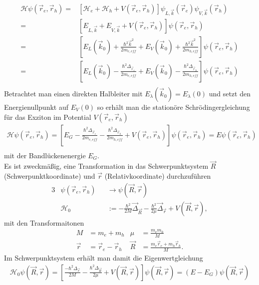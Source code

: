 \begin{align}
\mathcal{H} \psi\left({\vec{r}_e,\vec{r}_h}\right)=&
\left[\mathcal{H}_e+\mathcal{H}_h+V(\vec{r}_e,\vec{r}_h)\right]\psi_{L,\vec{k}}(\vec{r}_e)\psi_{V,\vec{k}}(\vec{r}_h)\\
=& \left[E_{L,\vec{k}}+E_{V,\vec{k}}+V(\vec{r}_e,\vec{r}_h)\right] \psi\left({\vec{r}_e,\vec{r}_h}\right)\\
=&\left[E_L(\vec{k}_0)+\frac{\hbar^2\vec{k}^2}{2m_{e,eff}}+E_V(\vec{k}_0)+\frac{\hbar^2\vec{k}^2}{2m_{h,eff}}\right] \psi\left({\vec{r}_e,\vec{r}_h}\right)\\
=&\left[E_L(\vec{k}_0)-\frac{\hbar^2\Delta_{\vec{r}_e}}{2m_{e,eff}}+E_V(\vec{k}_0)-\frac{\hbar^2\Delta_{\vec{r}_h}}{2m_{h,eff}}\right] \psi\left({\vec{r}_e,\vec{r}_h}\right)\\
\end{align}
Betrachtet man einen direkten Halbleiter mit $E_{\lambda}(\vec{k}_0)=E_{\lambda}(0)$ und setzt den Energienullpunkt auf $E_V(0)$
so erhält man die stationöre Schrödingergleichung für das Exziton im Potential $V(\vec{r}_e,\vec{r}_h)$
\begin{align}
\mathcal{H} \psi\left({\vec{r}_e,\vec{r}_h}\right)
=\left[E_G-\frac{\hbar^2\Delta_{\vec{r}_e}}{2m_{e,eff}}-\frac{\hbar^2\Delta_{\vec{r}_h}}{2m_{h,eff}}+V(\vec{r}_e,\vec{r}_h)\right] \psi\left({\vec{r}_e,\vec{r}_h}\right)=E\psi\left({\vec{r}_e,\vec{r}_h}\right)\\
\end{align}
mit der Bandlückenenergie $E_G$.\\
Es ist zweckmäßig, eine Transformation in das Schwerpunktsystem $\vec{R}$ (Schwerpunktkoordinate) und $\vec{r}$ (Relativkoordinate) durchzuführen 
\begin{alignat*}{3}
&\psi\left({\vec{r}_e,\vec{r}_h}\right)&&\rightarrow \psi\left({\vec{R},\vec{r}}\right)
\\
&\mathcal{H}_{0} &&:= -\frac{\hbar ^2}{2M}\vec{\Delta} _{\vec{R}} -\frac{\hbar ^2}{2\mu}\vec{\Delta} _{\vec{r}} +V\left(\vec{R},\vec{r}\right),
\end{alignat*}
mit den Transformaitonen
\begin{align*}
M		&= m_e+m_h  				&\mu		&=\frac{m_e m_h}{M}\\
\vec{r}	&=\vec{r} _e-\vec{r} _h  	&\vec{R} 	&=\frac{m_e\vec{r} _e+m_h\vec{r} _h}{M}.
\end{align*}
Im Schwerpunktsystem erhält man damit die Eigenwertgleichung
\begin{align}
\mathcal{H}_0 \psi\left({\vec{R},\vec{r}}\right)
=\left[\frac{-\hbar^2\Delta_{\vec{r}}}{2M}-\frac{\hbar^2\Delta_{\vec{R}}}{2\mu}+V(\vec{R},\vec{r})\right] \psi\left({\vec{R},\vec{r}}\right)=(E-E_G)\psi\left({\vec{R},\vec{r}}\right)
\end{align}


